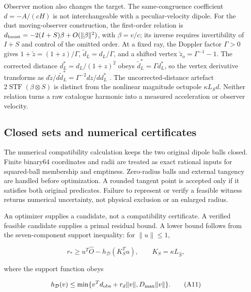 Observer motion also changes the target. The same-congruence coefficient
\(d=-A/(cH)\) is not interchangeable with a peculiar-velocity dipole.
For the dust moving-observer construction, the first-order relation is
\(d_{\rm boost}=-2(I+S)\beta+O(\|\beta\|^2)\), with \(\beta=v/c\); its
inverse requires invertibility of \(I+S\) and control of the omitted
order. At a fixed ray, the Doppler factor \(\Gamma>0\) gives
\(1+\widetilde z=(1+z)/\Gamma\), \(\widetilde d_L=d_L/\Gamma\), and a
shifted vertex \(\widetilde z_o=\Gamma^{-1}-1\). The corrected distance
\(d_L^*=d_L/(1+z)^2\) obeys \(\widetilde d_L^*=\Gamma d_L^*\), so the
vertex derivative transforms as
\(d\widetilde z/d\widetilde d_L^*=\Gamma^{-2}dz/dd_L^*\)
\cite{Maartens2024}. The uncorrected-distance artefact
\(2\operatorname{STF}(\beta\otimes S)\) is distinct from the nonlinear
magnitude octupole \(\kappa L_Sd\). Neither relation turns a raw
catalogue harmonic into a measured acceleration or observer velocity.

\hypertarget{closed-sets-and-numerical-certificates}{%
\subsection{Closed sets and numerical
certificates}\label{closed-sets-and-numerical-certificates}}

The numerical compatibility calculation keeps the two original dipole
balls closed. Finite binary64 coordinates and radii are treated as exact
rational inputs for squared-ball membership and emptiness. Zero-radius
balls and external tangency are handled before optimization. A rounded
tangent point is accepted only if it satisfies both original predicates.
Failure to represent or verify a feasible witness returns numerical
uncertainty, not physical exclusion or an enlarged radius.

An optimizer supplies a candidate, not a compatibility certificate. A
verified feasible candidate supplies a primal residual bound. A lower
bound follows from the seven-component support inequality: for
\(\|u\|\leq1\),

\begin{equation}
r_*\geq u^T\widehat O-h_{\mathcal D}(K_S^Tu),\qquad K_S=\kappa L_{\widehat S},\tag{A10}
\end{equation}

where the support function obeys

\begin{equation}
h_{\mathcal D}(v)\leq
 \min\{v^Td_{\rm obs}+r_d\|v\|,D_{\max}\|v\|\}.\tag{A11}
\end{equation}

